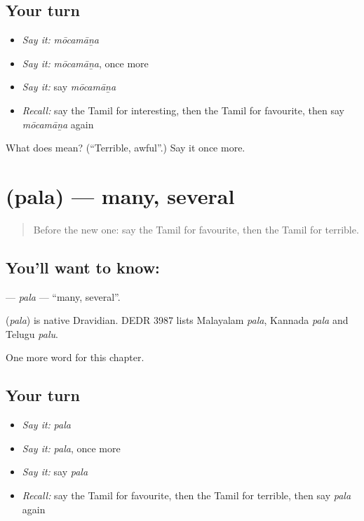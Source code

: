 \subsection*{Your turn}
\begin{itemize}
\raggedright
  \item \emph{Say it:} \emph{mōcamāṉa}
  \item \emph{Say it:} \emph{mōcamāṉa}, once more
  \item \emph{Say it:} say \emph{mōcamāṉa}
  \item \emph{Recall:} say the Tamil for interesting, then the Tamil for favourite, then say \emph{mōcamāṉa} again
\end{itemize}

\begin{tcolorbox}[breakable,colback=teal!4,colframe=teal!35!black,title={Before you move on}]
What does  mean? (\textquotedblleft{}Terrible, awful\textquotedblright{}.) Say it once more.
\end{tcolorbox}
\section[\texorpdfstring{\ta{பல} (pala)}{பல (pala)}]{ (pala) — many, several}

\label{lesson:TA-C181-pala}



\begin{quote}
Before the new one: say the Tamil for favourite, then the Tamil for terrible.
\end{quote}

\subsection*{You'll want to know: }
\textbf{} — \emph{pala} — \textquotedblleft{}many, several\textquotedblright{}.

\begin{cousinweb}
\textbf{} (\emph{pala}) is native Dravidian. DEDR 3987 lists Malayalam \emph{pala}, Kannada \emph{pala} and Telugu \emph{palu}.
\end{cousinweb}

\begin{grammarlens}[title={What you've built}]
One more word for this chapter.
\end{grammarlens}

\subsection*{Your turn}
\begin{itemize}
\raggedright
  \item \emph{Say it:} \emph{pala}
  \item \emph{Say it:} \emph{pala}, once more
  \item \emph{Say it:} say \emph{pala}
  \item \emph{Recall:} say the Tamil for favourite, then the Tamil for terrible, then say \emph{pala} again
\end{itemize}

